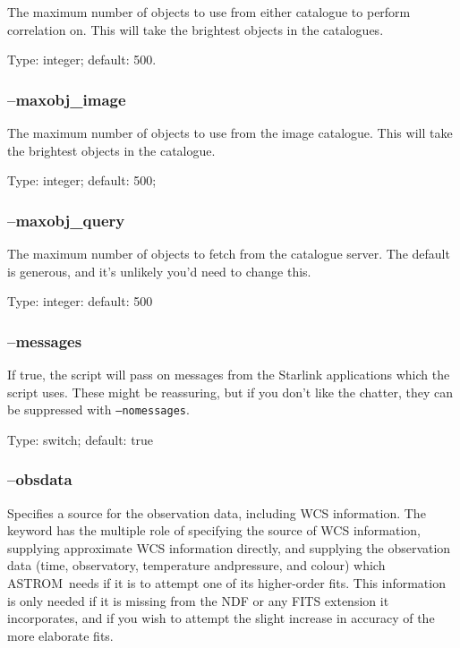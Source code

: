 \documentclass[twoside,11pt]{article}
\newcommand{\xlabel}[1]{}
\newcommand{\ASTROM}{{\footnotesize ASTROM}\normalsize}
\begin{document}
The maximum number of objects to use from either catalogue to perform
correlation on. This will take the brightest objects in the catalogues.

Type: integer; default: 500.

\subsubsection{\xlabel{sb_options_maxobj_image}--maxobj\_image\label{sb:options:maxobj_image}}

The maximum number of objects to use from the image catalogue. This will take
the brightest objects in the catalogue.

Type: integer; default: 500;

\subsubsection{\xlabel{sb_options_maxobj_query}--maxobj\_query\label{sb:options:maxobj_query}}

The maximum number of objects to fetch from the catalogue server. The default
is generous, and it's unlikely you'd need to change this.

Type: integer: default: 500

\subsubsection{\xlabel{sb_options_messages}--messages\label{sb:options:messages}}

If true, the script will pass on messages from the Starlink applications which
the script uses.  These might be reassuring, but if you don't like the
chatter, they can be suppressed with \texttt{--nomessages}.

Type: switch; default: true

\subsubsection{\xlabel{sb_options_obsdata}--obsdata\label{sb:options:obsdata}}

Specifies a source for the observation data, including WCS information.  The
keyword has the multiple role of specifying the source of WCS information,
supplying approximate WCS information directly, and supplying the observation
data (time, observatory, temperature andpressure, and colour) which \ASTROM\ 
needs if it is to attempt one of its higher-order fits.  This information is
only needed if it is missing from the NDF or any FITS extension it
incorporates, and if you wish to attempt the slight increase in accuracy of
the more elaborate fits.
          
\end{document}
